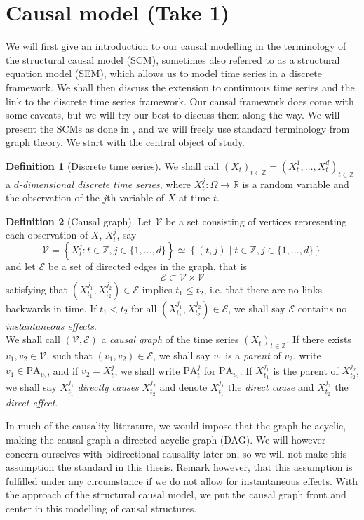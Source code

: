 \documentclass[11pt, a4paper]{memoir}
\theoremstyle{plain}
\theoremstyle{definition}
\newtheorem{defn}{Definition}
\newcommand{\mZ}{\mathbb{Z}}
\newcommand{\mR}{\mathbb{R}}
\begin{document}
\section{Causal model (Take 1)}
We will first give an introduction to our causal modelling in the terminology of the structural causal model (SCM), sometimes also referred to as a structural equation model (SEM),  which allows us to model time series in a discrete framework. We shall then discuss the extension to continuous time series and the link to the discrete time series framework. Our causal framework does come with some caveats, but we will try our best to discuss them along the way. We will present the SCMs as done in \cite{Peters}, and we will freely use standard terminology from graph theory. We start with the central object of study.
\begin{defn}[Discrete time series]
We shall call $(X_t)_{t\in \mZ}=(X_t^{1},\ldots,X_{t}^d)_{t\in \mZ}$ a \emph{$d$-dimensional discrete time series}, where $X_t^j:\Omega\to \mR$ is a random variable and the observation of the $j$th variable of $X$ at time $t$.
\end{defn}
\begin{defn}[Causal graph]
Let $\mathcal{V}$ be a set consisting of vertices representing each observation of $X$, $X_t^j$, say $$\mathcal{V}=\left\{X_t^j: t\in \mZ,j\in\{1,\ldots,d\}\right\}\simeq \left\{(t,j)\mid t\in \mZ, j\in \{1,\ldots,d\}\right\}$$ and let $\mathcal{E}$ be a set of directed edges in the graph, that is 
$$\mathcal{E}\subset \mathcal{V}\times \mathcal{V}$$
satisfying that $(X_{t_1}^{j_1},X_{t_2}^{j_2})\in \mathcal{E}$ implies $t_1\leq t_2$, i.e. that there are no links backwards in time. If $t_1<t_2$ for all $(X_{t_1}^{j_1},X_{t_2}^{j_2})\in \mathcal{E}$, we shall say $\mathcal{E}$ contains no \emph{instantaneous effects}.\\
We shall call $(\mathcal{V}, \mathcal{E})$ a \emph{causal graph} of the time series $(X_t)_{t\in \mZ}$. If there exists $v_1,v_2\in \mathcal{V}$, such that $(v_1,v_2)\in \mathcal{E}$, we shall say $v_1$ is a \emph{parent} of $v_2$, write $v_1\in \text{PA}_{v_2}$, and if $v_2=X_t^j$, we shall write $\text{PA}_{t}^j$ for $\text{PA}_{v_2}$. If $X_{t_1}^{j_1}$ is the parent of $X_{t_2}^{j_2}$, we shall say $X_{t_1}^{j_1}$ \emph{directly causes} $X_{t_2}^{j_2}$ and denote $X_{t_1}^{j_1}$ the \emph{direct cause} and $X_{t_2}^{j_2}$ the \emph{direct effect}.
\end{defn}
In much of the causality literature, we would impose that the graph be acyclic, making the causal graph a directed acyclic graph (DAG). We will however concern ourselves with bidirectional causality later on, so we will not make this assumption the standard in this thesis. Remark however, that this assumption is fulfilled under any circumstance if we do not allow for instantaneous effects. With the approach of the structural causal model, we put the causal graph front and center in this modelling of causal structures.
\end{document}
